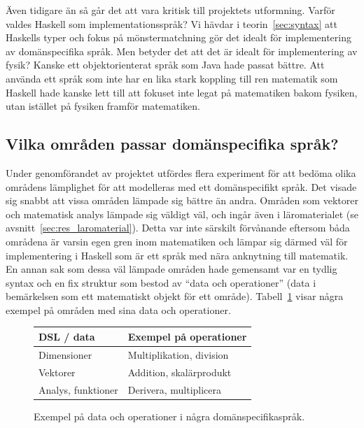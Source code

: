 Även tidigare än så går det att vara kritisk till projektets utformning. Varför
valdes Haskell som implementationsspråk? Vi hävdar i teorin~\ref{sec:syntax} att
Haskells typer och fokus på mönstermatchning gör det idealt för implementering
av domänspecifika språk.  Men betyder det att det är idealt för implementering
av fysik? Kanske ett objektorienterat språk som Java hade passat bättre. Att
använda ett språk som inte har en lika stark koppling till ren matematik som
Haskell hade kanske lett till att fokuset inte legat på matematiken
bakom fysiken, utan istället på fysiken framför matematiken.

\subsection{Vilka områden passar domänspecifika språk?}\label{sec:lampligt}

Under genomförandet av projektet utfördes flera experiment för att bedöma olika
områdens lämplighet för att modelleras med ett domänspecifikt språk. Det visade
sig snabbt att vissa områden lämpade sig bättre än andra. Områden
som vektorer och matematisk analys lämpade sig väldigt väl, och ingår även i
läromaterialet (se avsnitt~\ref{sec:res_laromaterial}). Detta var inte särskilt
förvånande eftersom båda områdena är varsin egen gren inom matematiken
och lämpar sig därmed väl för implementering i Haskell som är ett språk med nära
anknytning till matematik. En annan sak som dessa väl lämpade områden hade
gemensamt var en tydlig syntax och en fix struktur som bestod av ``data och
operationer'' (data i bemärkelsen som ett matematiskt objekt för ett område). Tabell~\ref{tab:data_och_ops} visar några exempel på områden med
sina data och operationer.

\captionsetup[figure]{name=Tabell}

\begin{figure}[tph]
\centering
\caption{Exempel på data och operationer i några domänspecifikaspråk.}\label{tab:data_och_ops} 
\begin{tabular}{l|l}
\toprule
DSL / data & Exempel på operationer \\ \midrule
Dimensioner & Multiplikation, division \\
Vektorer & Addition, skalärprodukt \\
Analys, funktioner & Derivera, multiplicera \\ \bottomrule
\end{tabular}
\end{figure}

